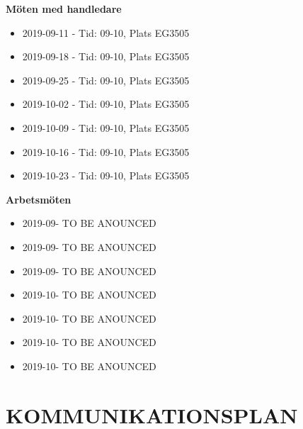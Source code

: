 \documentclass[a4paper]{article}
\begin{document}
\textbf{Möten med handledare}
\begin{itemize}
	\item 2019-09-11 - Tid: 09-10, Plats EG3505
	\item 2019-09-18 - Tid: 09-10, Plats EG3505
	\item 2019-09-25 - Tid: 09-10, Plats EG3505
	\item 2019-10-02 - Tid: 09-10, Plats EG3505
	\item 2019-10-09 - Tid: 09-10, Plats EG3505
	\item 2019-10-16 - Tid: 09-10, Plats EG3505
	\item 2019-10-23 - Tid: 09-10, Plats EG3505
	
\end{itemize}
\noindent
\textbf{Arbetsmöten}
\begin{itemize}
	\item 2019-09- TO BE ANOUNCED 
	\item 2019-09- TO BE ANOUNCED 
	\item 2019-09- TO BE ANOUNCED 
	\item 2019-10- TO BE ANOUNCED 
	\item 2019-10- TO BE ANOUNCED 
	\item 2019-10- TO BE ANOUNCED 
	\item 2019-10- TO BE ANOUNCED 
	
\end{itemize}
 

\section{KOMMUNIKATIONSPLAN}
\label{sec:komm}
\end{document}
